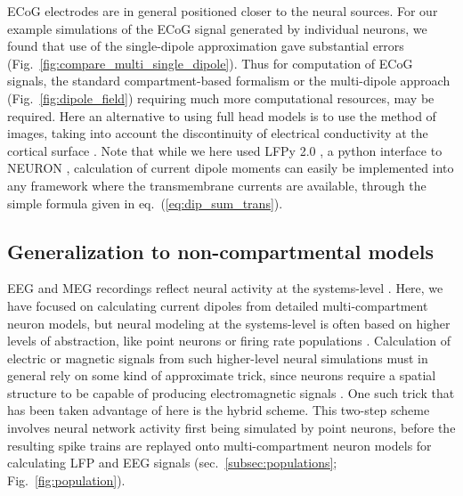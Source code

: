 \documentclass[preprint,10pt,authoryear]{elsarticle}
\begin{document}
ECoG electrodes are in general positioned closer to the neural sources. For our example simulations of the ECoG signal generated by individual neurons, we found that use of the single-dipole approximation gave substantial errors (Fig.~\ref{fig:compare_multi_single_dipole}). Thus for computation of ECoG signals, the standard compartment-based formalism or the multi-dipole approach 
(Fig.~\ref{fig:dipole_field}) requiring much more computational resources, may be required. 
Here an alternative to using full head models is to use the method of images, taking into 
account the discontinuity of electrical conductivity at the cortical surface \citep{Pettersen2006, HAGEN2018}.
Note that while we here used LFPy 2.0 \citep{HAGEN2018, HAGEN2019}, a python interface to NEURON \citep{CARNEVALE2006}, calculation of current dipole moments can easily be implemented into any framework where the transmembrane currents are available, through the simple formula given in eq.~(\ref{eq:dip_sum_trans}).

\subsection{Generalization to non-compartmental models}
EEG and MEG recordings reflect neural activity at the systems-level \citep{Pesaran2018, EINEVOLL2019}. Here, we have focused on calculating current dipoles from detailed multi-compartment neuron models, but neural modeling at the systems-level is often based on higher levels of abstraction, like point neurons \citep{NEST} or firing rate populations \citep{TVB}.
Calculation of electric or magnetic signals from such higher-level neural simulations must in general rely on some kind of 
approximate trick, since neurons require a spatial structure to be capable of producing electromagnetic signals \citep{EINEVOLL2013REVIEW}.
One such trick that has been taken advantage of here is the hybrid scheme. This two-step scheme involves neural network activity first being simulated by point neurons, before the resulting spike trains are replayed onto multi-compartment neuron models for calculating LFP and EEG signals (sec.~\ref{subsec:populations}; Fig.~\ref{fig:population}). 
\end{document}

